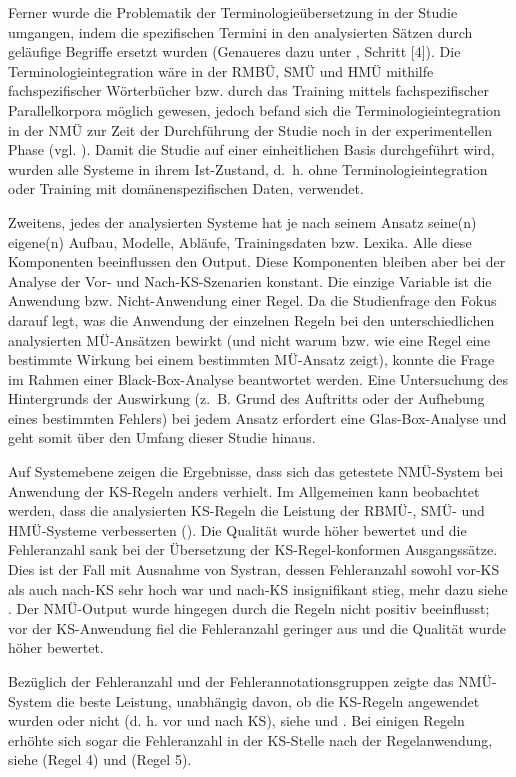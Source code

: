 Ferner wurde die Problematik der Terminologieübersetzung in der Studie umgangen, indem die spezifischen Termini in den analysierten Sätzen durch geläufige Begriffe ersetzt wurden (Genaueres dazu unter , Schritt [4]). Die Terminologieintegration wäre in der RMBÜ, SMÜ und HMÜ mithilfe fachspezifischer Wörterbücher bzw. durch das Training mittels fachspezifischer Parallelkorpora möglich gewesen, jedoch befand sich die Terminologieintegration in der NMÜ zur Zeit der Durchführung der Studie noch in der experimentellen Phase (vgl. \citealt{Eisold2017}). Damit die Studie auf einer einheitlichen Basis durchgeführt wird, wurden alle Systeme in ihrem Ist-Zustand, d.~h. ohne Terminologieintegration oder Training mit domänenspezifischen Daten, verwendet.

Zweitens, jedes der analysierten Systeme hat je nach seinem Ansatz seine(n) eigene(n) Aufbau, Modelle, Abläufe, Trainingsdaten bzw. Lexika. Alle diese Komponenten beeinflussen den Output. Diese Komponenten bleiben aber bei der Analyse der Vor- und Nach-KS-Szenarien konstant. Die einzige Variable ist die Anwendung bzw. Nicht-Anwendung einer Regel. Da die Studienfrage den Fokus darauf legt, was die Anwendung der einzelnen Regeln bei den unterschiedlichen analysierten MÜ-Ansätzen bewirkt (und nicht warum bzw. wie eine Regel eine bestimmte Wirkung bei einem bestimmten MÜ-Ansatz zeigt), konnte die Frage im Rahmen einer Black-Box-Analyse beantwortet werden. Eine Untersuchung des Hintergrunds der Auswirkung (z.~B. Grund des Auftritts oder der Aufhebung eines bestimmten Fehlers) bei jedem Ansatz erfordert eine Glas-Box-Analyse und geht somit über den Umfang dieser Studie hinaus.

Auf Systemebene zeigen die Ergebnisse, dass sich das getestete NMÜ-System bei Anwendung der KS-Regeln anders verhielt. Im Allgemeinen kann beobachtet werden, dass die analysierten KS-Regeln die Leistung der RBMÜ-, SMÜ- und HMÜ-Systeme verbesserten (). Die Qualität wurde höher bewertet und die Fehleranzahl sank bei der Übersetzung der KS-Regel-konformen Ausgangssätze. Dies ist der Fall mit Ausnahme von Systran, dessen Fehleranzahl sowohl vor-KS als auch nach-KS sehr hoch war und nach-KS insignifikant stieg, mehr dazu siehe . Der NMÜ-Output wurde hingegen durch die Regeln nicht positiv beeinflusst; vor der KS-Anwendung fiel die Fehleranzahl geringer aus und die Qualität wurde höher bewertet.

Bezüglich der Fehleranzahl und der Fehlerannotationsgruppen zeigte das NMÜ-System die beste Leistung, unabhängig davon, ob die KS-Regeln angewendet wurden oder nicht (d. h. vor und nach KS), siehe  und . Bei einigen Regeln erhöhte sich sogar die Fehleranzahl in der KS-Stelle nach der Regelanwendung, siehe  (Regel 4) und  (Regel 5).

